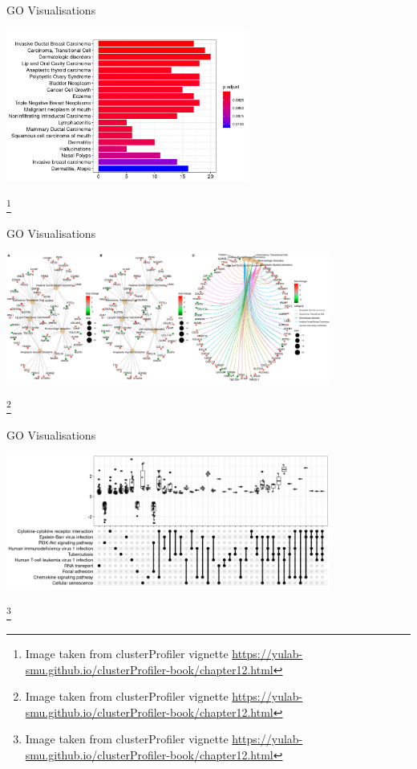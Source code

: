\documentclass[aspectratio=169,11pt]{beamer}
\newcommand\blfootnote[1]{%
  \begingroup
  \renewcommand\thefootnote{}\footnote{#1}%
  \addtocounter{footnote}{-1}%
  \endgroup
}
\begin{document}
\begin{frame}{GO Visualisations}

	\begin{center}
	\includegraphics[width=0.6\textwidth]{figures/Barplot-1.png}
	\end{center}
	
\blfootnote{Image taken from clusterProfiler vignette \url{https://yulab-smu.github.io/clusterProfiler-book/chapter12.html}}

\end{frame}

\begin{frame}{GO Visualisations}

	\begin{center}
	\includegraphics[width=0.8\textwidth]{figures/Networkplot-1.png}
	\end{center}
	
\blfootnote{Image taken from clusterProfiler vignette \url{https://yulab-smu.github.io/clusterProfiler-book/chapter12.html}}

\end{frame}

\begin{frame}{GO Visualisations}

	\begin{center}
	\includegraphics[width=0.8\textwidth]{figures/upsetGSEA-1.png}
	\end{center}
	
\blfootnote{Image taken from clusterProfiler vignette \url{https://yulab-smu.github.io/clusterProfiler-book/chapter12.html}}

\end{frame}
\end{document}
